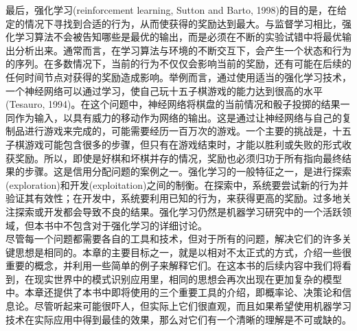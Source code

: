 \documentclass[b5paper]{book}
\numberwithin{equation}{chapter}
\begin{document}
{	\indent 最后，强化学习(reinforcement learning, Sutton and Barto, 1998)的目的是，在给定的情况下寻找到合适的行为，从而使获得的奖励达到最大。与监督学习相比，强化学习算法不会被告知哪些是最优的输出，而是必须在不断的实验试错中将最优输出分析出来。通常而言，在学习算法与环境的不断交互下，会产生一个状态和行为的序列。在多数情况下，当前的行为不仅仅会影响当前的奖励，还有可能在后续的任何时间节点对获得的奖励造成影响。举例而言，通过使用适当的强化学习技术，一个神经网络可以通过学习，使自己玩十五子棋游戏的能力达到很高的水平(Tesauro, 1994)。在这个问题中，神经网络将棋盘的当前情况和骰子投掷的结果一同作为输入，以具有威力的移动作为网络的输出。这是通过让神经网络与自己的复制品进行游戏来完成的，可能需要经历一百万次的游戏。一个主要的挑战是，十五子棋游戏可能包含很多的步骤，但只有在游戏结束时，才能以胜利或失败的形式收获奖励。所以，即使是好棋和坏棋并存的情况，奖励也必须归功于所有指向最终结果的步骤。这是信用分配问题的案例之一。强化学习的一般特征之一，是进行探索(exploration)和开发(exploitation)之间的制衡。在探索中，系统要尝试新的行为并验证其有效性；在开发中，系统要利用已知的行为，来获得更高的奖励。过多地关注探索或开发都会导致不良的结果。强化学习仍然是机器学习研究中的一个活跃领域，但本书中不包含对于强化学习的详细讨论。\\
	\indent 尽管每一个问题都需要各自的工具和技术，但对于所有的问题，解决它们的许多关键思想是相同的。本章的主要目标之一，就是以相对不太正式的方式，介绍一些很重要的概念，并利用一些简单的例子来解释它们。在这本书的后续内容中我们将看到，在现实世界中的模式识别应用里，相同的思想会再次出现在更加复杂的模型中。本章还提供了本书中即将使用的三个重要工具的介绍，即概率论、决策论和信息论。尽管听起来可能很吓人，但实际上它们很直观，而且如果希望使用机器学习技术在实际应用中得到最佳的效果，那么对它们有一个清晰的理解是不可或缺的。}
\end{document}
